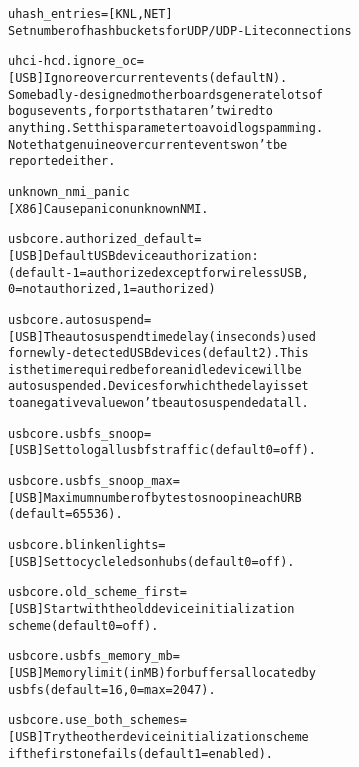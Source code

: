 \documentclass[a4paper,8pt,english]{sphinxmanual}
\begin{document}
\begin{alltt}
        uhash\_entries=  {[}KNL,NET{]}
                        Set number of hash buckets for UDP/UDP-Lite connections

        uhci-hcd.ignore\_oc=
                        {[}USB{]} Ignore overcurrent events (default N).
                        Some badly-designed motherboards generate lots of
                        bogus events, for ports that aren't wired to
                        anything.  Set this parameter to avoid log spamming.
                        Note that genuine overcurrent events won't be
                        reported either.

        unknown\_nmi\_panic
                        {[}X86{]} Cause panic on unknown NMI.

        usbcore.authorized\_default=
                        {[}USB{]} Default USB device authorization:
                        (default -1 = authorized except for wireless USB,
                        0 = not authorized, 1 = authorized)

        usbcore.autosuspend=
                        {[}USB{]} The autosuspend time delay (in seconds) used
                        for newly-detected USB devices (default 2).  This
                        is the time required before an idle device will be
                        autosuspended.  Devices for which the delay is set
                        to a negative value won't be autosuspended at all.

        usbcore.usbfs\_snoop=
                        {[}USB{]} Set to log all usbfs traffic (default 0 = off).

        usbcore.usbfs\_snoop\_max=
                        {[}USB{]} Maximum number of bytes to snoop in each URB
                        (default = 65536).

        usbcore.blinkenlights=
                        {[}USB{]} Set to cycle leds on hubs (default 0 = off).

        usbcore.old\_scheme\_first=
                        {[}USB{]} Start with the old device initialization
                        scheme (default 0 = off).

        usbcore.usbfs\_memory\_mb=
                        {[}USB{]} Memory limit (in MB) for buffers allocated by
                        usbfs (default = 16, 0 = max = 2047).

        usbcore.use\_both\_schemes=
                        {[}USB{]} Try the other device initialization scheme
                        if the first one fails (default 1 = enabled).


\end{alltt}
\end{document}

